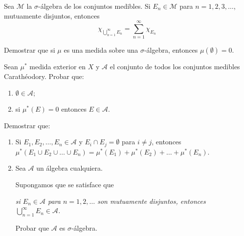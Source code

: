 \documentclass{book}
\begin{document}
\begin{ejer}{} Sea $\mathcal{M}$ la $\sigma$-álgebra de los conjuntos medibles. 
Si $E_n \in \mathcal{M}$ para $n=1,2,3,\ldots$, mutuamente disjuntos,  entonces
\[
\chi_{\bigcup\limits_{n=1}^{\infty}E_n}=\sum\limits_{n=1}^{\infty}\chi_{E_n}
\]
\end{ejer}

\begin{ejer}{} Demostrar que si $\mu$ es una medida sobre una $\sigma$-álgebra,  entonces $\mu(\emptyset)=0$.
\end{ejer}

\begin{ejer}{}
Sean $\mu^*$ medida exterior en $X$ y $\mathcal{A}$ el conjunto de todos los conjuntos 
medibles Carathéodory.
Probar que:
\begin{enumerate}
\item $\emptyset  \in \mathcal{A}$;
\item si $\mu^{*}(E)=0$ entonces $E \in \mathcal{A}$.
\end{enumerate}
\end{ejer}

\begin{ejer}{} Demostrar que:
\begin{enumerate}
\item Si $E_1,E_2,\ldots,E_n \in  \mathcal{A}$ y $E_i\cap E_j=\emptyset$ para $i\neq j$, entonces 
$\mu^{*}(E_1\cup E_2\cup\ldots\cup E_n )=\mu^{*}(E_1)+\mu^{*}(E_2)+\ldots+\mu^{*}(E_n)$.
\item Sea $\mathcal{A}$ un álgebra cualquiera. 

Supongamos que se satisface que 

\textit{
si $E_n \in \mathcal{A}$ para $ n=1,2,\ldots$ son mutuamente disjuntos,  entonces 
$\bigcup\limits_{n=1}^{\infty} E_n\in \mathcal{A}$.}

Probar que $\mathcal{A}$ es $\sigma$-álgebra.
\end{enumerate}
\end{ejer}
	


\end{document}
